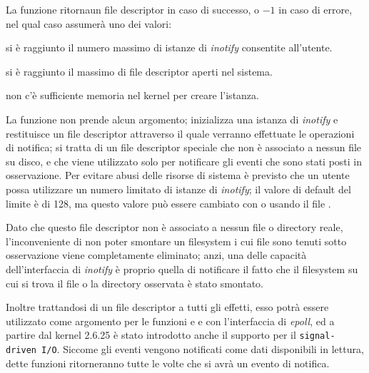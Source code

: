 \begin{funcproto}{
}

{La funzione ritornaun file descriptor in caso di successo, o $-1$ in caso di
  errore, nel qual caso  assumerà uno dei valori:
  \begin{errlist}
  \item[\errcode{EMFILE}] si è raggiunto il numero massimo di istanze di
    \textit{inotify} consentite all'utente.
  \item[\errcode{ENFILE}] si è raggiunto il massimo di file descriptor aperti
    nel sistema.
  \item[\errcode{ENOMEM}] non c'è sufficiente memoria nel kernel per creare
    l'istanza.
  \end{errlist}
}
\end{funcproto}

La funzione non prende alcun argomento; inizializza una istanza di
\textit{inotify} e restituisce un file descriptor attraverso il quale verranno
effettuate le operazioni di notifica; si tratta di un file descriptor speciale
che non è associato a nessun file su disco, e che viene utilizzato solo per
notificare gli eventi che sono stati posti in osservazione. Per evitare abusi
delle risorse di sistema è previsto che un utente possa utilizzare un numero
limitato di istanze di \textit{inotify}; il valore di default del limite è di
128, ma questo valore può essere cambiato con  o usando il file
.

Dato che questo file descriptor non è associato a nessun file o directory
reale, l'inconveniente di non poter smontare un filesystem i cui file sono
tenuti sotto osservazione viene completamente eliminato; anzi, una delle
capacità dell'interfaccia di \textit{inotify} è proprio quella di notificare
il fatto che il filesystem su cui si trova il file o la directory osservata è
stato smontato.

Inoltre trattandosi di un file descriptor a tutti gli effetti, esso potrà
essere utilizzato come argomento per le funzioni  e  e
con l'interfaccia di \textit{epoll}, ed a partire dal kernel 2.6.25 è stato
introdotto anche il supporto per il \texttt{signal-driven I/O}.  Siccome gli
eventi vengono notificati come dati disponibili in lettura, dette funzioni
ritorneranno tutte le volte che si avrà un evento di notifica.

